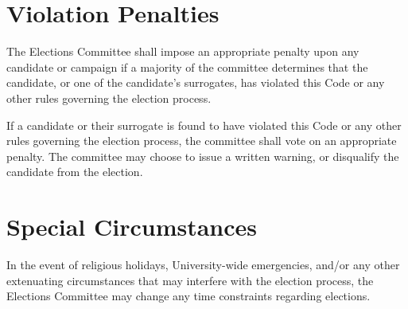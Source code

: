 \section{Violation Penalties}
\begin{bylaws-number}
  \item The Elections Committee shall impose an appropriate penalty upon any candidate or campaign if a majority of the committee determines that the candidate, or one of the candidate’s surrogates, has violated this Code or any other rules governing the election process.
  \item If a candidate or their surrogate is found to have violated this Code or any other rules governing the election process, the committee shall vote on an appropriate penalty. The committee may choose to issue a written warning, or disqualify the candidate from the election.
\end{bylaws-number}

\section{Special Circumstances}
In the event of religious holidays, University-wide emergencies, and/or any other extenuating circumstances that may interfere with the election process, the Elections Committee may change any time constraints regarding elections.

